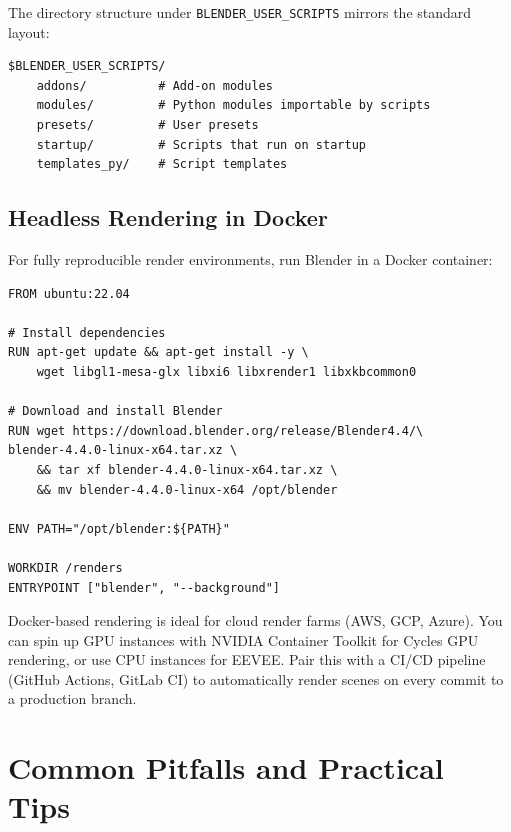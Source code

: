 The directory structure under \texttt{BLENDER\_USER\_SCRIPTS} mirrors the standard layout:

\begin{codebox}
\begin{verbatim}
$BLENDER_USER_SCRIPTS/
    addons/          # Add-on modules
    modules/         # Python modules importable by scripts
    presets/         # User presets
    startup/         # Scripts that run on startup
    templates_py/    # Script templates
\end{verbatim}
\end{codebox}

\subsection{Headless Rendering in Docker}

For fully reproducible render environments, run Blender in a Docker container:

\begin{lstlisting}[language={}]
FROM ubuntu:22.04

# Install dependencies
RUN apt-get update && apt-get install -y \
    wget libgl1-mesa-glx libxi6 libxrender1 libxkbcommon0

# Download and install Blender
RUN wget https://download.blender.org/release/Blender4.4/\
blender-4.4.0-linux-x64.tar.xz \
    && tar xf blender-4.4.0-linux-x64.tar.xz \
    && mv blender-4.4.0-linux-x64 /opt/blender

ENV PATH="/opt/blender:${PATH}"

WORKDIR /renders
ENTRYPOINT ["blender", "--background"]
\end{lstlisting}

\begin{tipbox}
Docker-based rendering is ideal for cloud render farms (AWS, GCP, Azure). You can spin up GPU instances with NVIDIA Container Toolkit for Cycles GPU rendering, or use CPU instances for EEVEE. Pair this with a CI/CD pipeline (GitHub Actions, GitLab CI) to automatically render scenes on every commit to a production branch.
\end{tipbox}


\section{Common Pitfalls and Practical Tips}
\label{sec:scripting-pitfalls}

